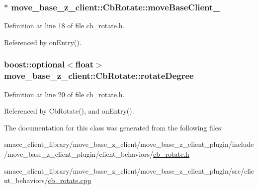 \subsubsection[{\texorpdfstring{move\+Base\+Client\+\_\+}{moveBaseClient_}}]{$\ast$ move\+\_\+base\+\_\+z\+\_\+client\+::\+Cb\+Rotate\+::move\+Base\+Client\+\_\+}\hypertarget{classmove__base__z__client_1_1CbRotate_a292c3739c4c1e668c0c6e241127b5c50}{}\label{classmove__base__z__client_1_1CbRotate_a292c3739c4c1e668c0c6e241127b5c50}


Definition at line 18 of file cb\+\_\+rotate.\+h.



Referenced by on\+Entry().

\subsubsection[{\texorpdfstring{rotate\+Degree}{rotateDegree}}]{\setlength{\rightskip}{0pt plus 5cm}boost\+::optional$<$float$>$ move\+\_\+base\+\_\+z\+\_\+client\+::\+Cb\+Rotate\+::rotate\+Degree}\hypertarget{classmove__base__z__client_1_1CbRotate_a30d0f24b857149d78a023635562516b6}{}\label{classmove__base__z__client_1_1CbRotate_a30d0f24b857149d78a023635562516b6}


Definition at line 20 of file cb\+\_\+rotate.\+h.



Referenced by Cb\+Rotate(), and on\+Entry().



The documentation for this class was generated from the following files\+:\begin{DoxyCompactItemize}
\item 
smacc\+\_\+client\+\_\+library/move\+\_\+base\+\_\+z\+\_\+client/move\+\_\+base\+\_\+z\+\_\+client\+\_\+plugin/include/move\+\_\+base\+\_\+z\+\_\+client\+\_\+plugin/client\+\_\+behaviors/\hyperlink{cb__rotate_8h}{cb\+\_\+rotate.\+h}\item 
smacc\+\_\+client\+\_\+library/move\+\_\+base\+\_\+z\+\_\+client/move\+\_\+base\+\_\+z\+\_\+client\+\_\+plugin/src/client\+\_\+behaviors/\hyperlink{cb__rotate_8cpp}{cb\+\_\+rotate.\+cpp}\end{DoxyCompactItemize}

